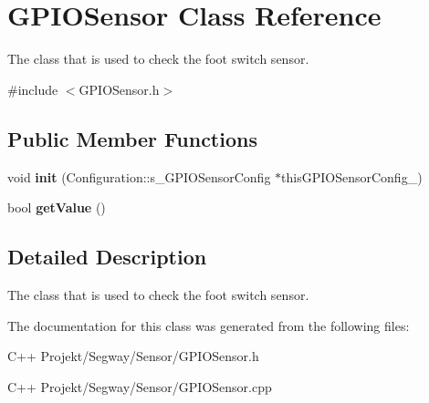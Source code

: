\hypertarget{class_g_p_i_o_sensor}{}\section{G\+P\+I\+O\+Sensor Class Reference}
\label{class_g_p_i_o_sensor}


The class that is used to check the foot switch sensor.  




{\ttfamily \#include $<$G\+P\+I\+O\+Sensor.\+h$>$}

\subsection*{Public Member Functions}
\begin{DoxyCompactItemize}
\item 
\hypertarget{class_g_p_i_o_sensor_a473b62bbc4372c97b63d2855a3387d57}{}void {\bfseries init} (Configuration\+::s\+\_\+\+G\+P\+I\+O\+Sensor\+Config $\ast$this\+G\+P\+I\+O\+Sensor\+Config\+\_\+)\label{class_g_p_i_o_sensor_a473b62bbc4372c97b63d2855a3387d57}

\item 
\hypertarget{class_g_p_i_o_sensor_a5078e0d542e1753ef63da00e29f3b7c1}{}bool {\bfseries get\+Value} ()\label{class_g_p_i_o_sensor_a5078e0d542e1753ef63da00e29f3b7c1}

\end{DoxyCompactItemize}


\subsection{Detailed Description}
The class that is used to check the foot switch sensor. 

The documentation for this class was generated from the following files\+:\begin{DoxyCompactItemize}
\item 
C++ Projekt/\+Segway/\+Sensor/G\+P\+I\+O\+Sensor.\+h\item 
C++ Projekt/\+Segway/\+Sensor/G\+P\+I\+O\+Sensor.\+cpp\end{DoxyCompactItemize}
